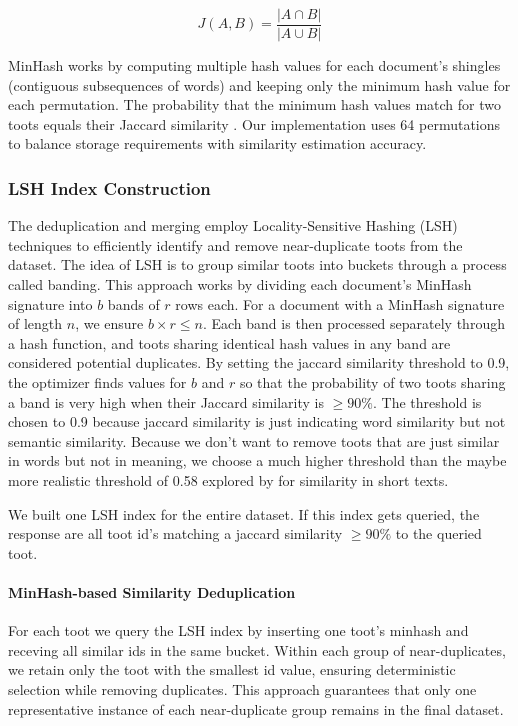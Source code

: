 \begin{equation}
J(A,B) = \frac{|A \cap B|}{|A \cup B|}
\end{equation}

MinHash works by computing multiple hash values for each document's shingles (contiguous subsequences of words) and keeping only the minimum hash value for each permutation. The probability that the minimum hash values match for two toots equals their Jaccard similarity \cite{broder:2000}. Our implementation uses 64 permutations to balance storage requirements with similarity estimation accuracy.

\subsubsection{LSH Index Construction}\label{step:lsh} 
The deduplication and merging employ Locality-Sensitive Hashing (LSH) \cite{leskovec:2014} techniques to efficiently identify and remove near-duplicate toots from the dataset. The idea of LSH is to group similar toots into buckets through a process called banding. This approach works by dividing each document's MinHash signature into $b$ bands of $r$ rows each. For a document with a MinHash signature of length $n$, we ensure $b \times r \le n$. Each band is then processed separately through a hash function, and toots sharing identical hash values in any band are considered potential duplicates. By setting the jaccard similarity threshold to 0.9, the optimizer finds values for $b$ and $r$ so that the probability of two toots sharing a band is very high when their Jaccard similarity is $\geq90\%$. The threshold is chosen to 0.9 because jaccard similarity is just indicating word similarity but not semantic similarity. Because we don't want to remove toots that are just similar in words but not in meaning, we choose a much higher threshold than the maybe more realistic threshold of 0.58 explored by \citet{wu:2020} for similarity in short texts. 

We built one LSH index for the entire dataset. If this index gets queried, the response are all toot id's matching a jaccard similarity $\geq90\%$ to the queried toot.

\paragraph{MinHash-based Similarity Deduplication}\label{step:dedup} 
For each toot we query the LSH index by inserting one toot's minhash and receving all similar ids in the same bucket. Within each group of near-duplicates, we retain only the toot with the smallest id value, ensuring deterministic selection while removing duplicates. This approach guarantees that only one representative instance of each near-duplicate group remains in the final dataset.

